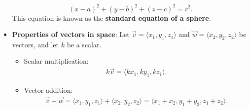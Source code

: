 \documentclass{report}
\begin{document}
\begin{itemize}
        \[
            (x - a)^2 + (y - b)^2 + (z - c)^2 = r^2.
        \]
        This equation is known as the \textbf{standard equation of a sphere}.
    \item \textbf{Properties of vectors in space}:
        Let $\vec{v} = \langle x_1, y_1, z_1 \rangle$ and $\vec{w} = \langle x_2, y_2, z_2 \rangle$ be vectors, and let $k$ be a scalar.
        \begin{itemize}
            \item Scalar multiplication:
                \begin{align*}
                     k\vec{v} = \langle kx_1, ky_1, kz_1 \rangle
                .\end{align*}
            \item Vector addition: 
                \begin{align*}
                    \vec{v} + \vec{w} = \langle x_1, y_1, z_1 \rangle + \langle x_2, y_2, z_2 \rangle = \langle x_1 + x_2, y_1 + y_2, z_1 + z_2 \rangle
                .\end{align*}


\end{itemize}
\end{itemize}
\end{document}
